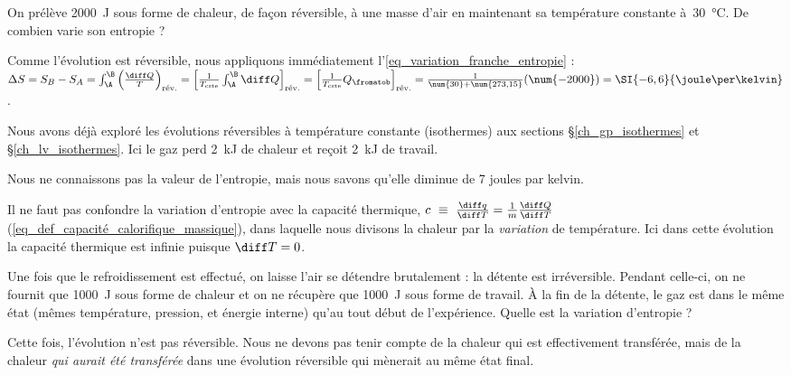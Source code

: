 		\begin{anexample}
		\label{exemple_delta_entropie_basics}
			On prélève \SI{2000}{\joule} sous forme de chaleur, de façon réversible, à une masse d’air en maintenant sa température constante à~\SI{30}{\degreeCelsius}. De combien varie son entropie ?
				\begin{answer}
					Comme l’évolution est réversible, nous appliquons immédiatement l’\cref{eq_variation_franche_entropie} : $\Delta S
						= S_B - S_A
						= \int_\A^\B \left( \frac{\diff Q}{T} \right)_\text{rév.}
						= \left[\frac{1}{T_\text{cste}} \int_\A^\B \diff Q \right]_\text{rév.}
						= \left[\frac{1}{T_\text{cste}} Q_\fromatob \right]_\text{rév.}
						= \frac{1}{\num{30} + \num{273,15}} (\num{-2000})
						= \SI{-6,6}{\joule\per\kelvin}$.
					\begin{remark}Nous avons déjà exploré les évolutions réversibles à température constante (isothermes) aux sections \S\ref{ch_gp_isothermes} et \S\ref{ch_lv_isothermes}. Ici le gaz perd \SI{2}{\kilo\joule} de chaleur et reçoit \SI{2}{\kilo\joule} de travail.\end{remark}
					\begin{remark}Nous ne connaissons pas la valeur de l’entropie, mais nous savons qu’elle diminue de 7 \si{joules} par \si{kelvin}.\end{remark}
					\begin{remark}Il ne faut pas confondre la variation d’entropie avec la capacité thermique, $c\ \equiv \ \frac{\diff q}{\diff T} = \frac{1}{m} \frac{\diff Q}{\diff T}$ (\ref{eq_def_capacité_calorifique_massique}), dans laquelle nous divisons la chaleur par la \emph{variation} de température. Ici dans cette évolution la capacité thermique est infinie puisque $\diff T = 0$.\end{remark}
				\end{answer}
			
			Une fois que le refroidissement est effectué, on laisse l’air se détendre brutalement : la détente est irréversible. Pendant celle-ci, on ne fournit que \SI{1000}{\joule} sous forme de chaleur et on ne récupère que \SI{1000}{\joule} sous forme de travail. À la fin de la détente, le gaz est dans le même état (mêmes température, pression, et énergie interne) qu’au tout début de l’expérience. Quelle est la variation d’entropie ?
				\begin{answer} Cette fois, l’évolution n’est pas réversible. Nous ne devons pas tenir compte de la chaleur qui est effectivement transférée, mais de la chaleur \emph{qui aurait été transférée} dans une évolution réversible qui mènerait au même état final.
				

\end{answer}
\end{anexample}
